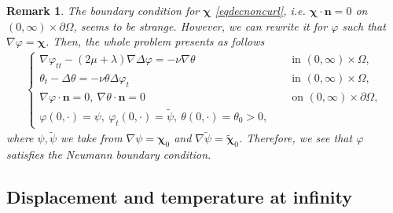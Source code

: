 \documentclass[11pt]{article}
\numberwithin{equation}{section}
\newtheorem{rem}[defi]{Remark}
\theoremstyle{plain}
\newcommand\bb[1]{\mathbf{#1}}
\newcommand{\tn}{\Omega}
\let \phi\varphi
\newcommand{\bs}[1]{\boldsymbol{#1}}
\begin{document}
\begin{rem}
The boundary condition for $\bs\chi$ \eqref{eqdecnoncurl}, i.e. $\bs\chi\cdot\bb n=0$ on $(0,\infty)\times\partial\Omega$, seems to be strange. However, we can rewrite it for $\phi$ such that $\nabla\phi=\bs\chi$. Then, the whole problem presents as follows
\begin{align*}
\begin{cases}
\nabla\phi_{tt}-(2\mu+\lambda)\nabla\Delta\phi =-\nu\nabla\theta & \quad \text{ in } (0,\infty)\times \tn,\\
\theta_t - \Delta \theta =- \nu\theta \Delta\phi_t& \quad \text{ in }  (0,\infty)\times\tn,\\
\nabla\phi\cdot \bb n=0,\ \nabla\theta\cdot\bb n=0&\quad\text{ on }(0,\infty)\times\partial\Omega,\\
\phi(0,\cdot)=\psi,\ \phi_t(0,\cdot) = \tilde{\psi},\ \theta(0,\cdot)=\theta_0>0,&
\end{cases}
\end{align*}
where $\psi,\tilde\psi$ we take from $\nabla\psi=\bs\chi_0$ and $\nabla\tilde\psi=\tilde{\bs\chi}_0$. Therefore, we see that $\phi$ satisfies the Neumann boundary condition.
\end{rem}

\subsection{Displacement and temperature at infinity}\label{subas}
\end{document}
